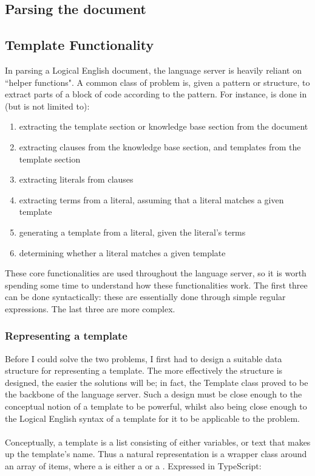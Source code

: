 \documentclass[../main.tex]{subfiles}
\begin{document}
\subsection{Parsing the document}


\subsection{Template Functionality}
In parsing a Logical English document, the language server is heavily reliant on ``helper functions". A common class of problem is, given a pattern or structure, to extract parts of a block of code according to the pattern. For instance, is done in (but is not limited to):
\begin{enumerate}
    \item extracting the template section or knowledge base section from the document
    \item extracting clauses from the knowledge base section, and templates from the template section
    \item extracting literals from clauses
    \item extracting terms from a literal, assuming that a literal matches a given template
    \item generating a template from a literal, given the literal's terms
    \item determining whether a literal matches a given template
\end{enumerate}
These core functionalities are used throughout the language server, so it is worth spending some time to understand how these functionalities work. The first three can be done syntactically: these are essentially done through simple regular expressions. The last three are more complex.

\subsubsection{Representing a template}
Before I could solve the two problems, I first had to design a suitable data structure for representing a template. The more effectively the structure is designed, the easier the solutions will be; in fact, the Template class proved to be the backbone of the language server. Such a design must be close enough to the conceptual notion of a template to be powerful, whilst also being close enough to the Logical English syntax of a template for it to be applicable to the problem. 
\\ 
\\
Conceptually, a template is a list  consisting of either variables, or text that makes up the template's name. Thus a natural representation is a wrapper class around an array of  items, where a  is either a  or a . Expressed in TypeScript:
\end{document}
